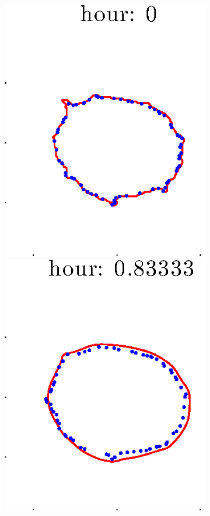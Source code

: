 \documentclass[12pt]{article}
\begin{document}
\begin{figure}[h!]
\begin{subfigure}[b]{.3\textwidth}
	\end{subfigure}
	\begin{subfigure}[b]{.3\textwidth}
	\centering
		\includegraphics[height=.15\textheight]{Pos10exp2/secondhalf/second1.eps}
		\includegraphics[height=.15\textheight]{Pos10exp2/secondhalf/second2.eps}

\end{subfigure}
\end{figure}
\end{document}
